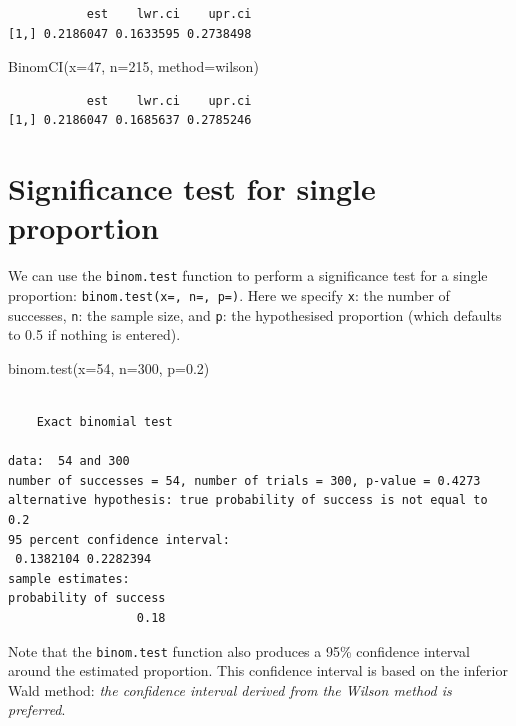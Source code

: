 \documentclass[
  a4paper,
]{memoir}
\newenvironment{Shaded}{\begin{snugshade}}{\end{snugshade}}
\newcommand{\AttributeTok}[1]{\textcolor[rgb]{0.00,0.00,0.00}{#1}}
\newcommand{\DecValTok}[1]{\textcolor[rgb]{0.00,0.00,0.00}{#1}}
\newcommand{\FloatTok}[1]{\textcolor[rgb]{0.00,0.00,0.00}{#1}}
\newcommand{\FunctionTok}[1]{\textcolor[rgb]{0.00,0.00,0.00}{#1}}
\newcommand{\NormalTok}[1]{\textcolor[rgb]{0.00,0.00,0.00}{#1}}
\newcommand{\StringTok}[1]{\textcolor[rgb]{0.00,0.00,0.00}{#1}}
\begin{document}
\begin{verbatim}
           est    lwr.ci    upr.ci
[1,] 0.2186047 0.1633595 0.2738498
\end{verbatim}

\begin{Shaded}
\begin{Highlighting}[]
\FunctionTok{BinomCI}\NormalTok{(}\AttributeTok{x=}\DecValTok{47}\NormalTok{, }\AttributeTok{n=}\DecValTok{215}\NormalTok{, }\AttributeTok{method=}\StringTok{\textquotesingle{}wilson\textquotesingle{}}\NormalTok{)}
\end{Highlighting}
\end{Shaded}

\begin{verbatim}
           est    lwr.ci    upr.ci
[1,] 0.2186047 0.1685637 0.2785246
\end{verbatim}

\section{Significance test for single
proportion}\label{significance-test-for-single-proportion}

We can use the \texttt{binom.test} function to perform a significance
test for a single proportion: \texttt{binom.test(x=,\ n=,\ p=)}. Here we
specify \texttt{x}: the number of successes, \texttt{n}: the sample
size, and \texttt{p}: the hypothesised proportion (which defaults to 0.5
if nothing is entered).

\begin{Shaded}
\begin{Highlighting}[]
\FunctionTok{binom.test}\NormalTok{(}\AttributeTok{x=}\DecValTok{54}\NormalTok{, }\AttributeTok{n=}\DecValTok{300}\NormalTok{, }\AttributeTok{p=}\FloatTok{0.2}\NormalTok{)}
\end{Highlighting}
\end{Shaded}

\begin{verbatim}

    Exact binomial test

data:  54 and 300
number of successes = 54, number of trials = 300, p-value = 0.4273
alternative hypothesis: true probability of success is not equal to 0.2
95 percent confidence interval:
 0.1382104 0.2282394
sample estimates:
probability of success 
                  0.18 
\end{verbatim}

Note that the \texttt{binom.test} function also produces a 95\%
confidence interval around the estimated proportion. This confidence
interval is based on the inferior Wald method: \emph{the confidence
interval derived from the Wilson method is preferred}.
\end{document}
